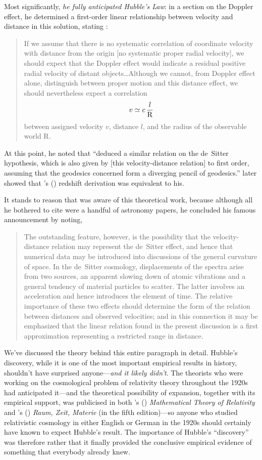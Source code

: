 \documentclass[12 pt]{article}
\def\citeapos#1{\citeauthor{#1}'s (\citeyear{#1})}
\begin{document}
Most significantly, \textit{he fully anticipated Hubble's Law}: in a section on the Doppler effect, he determined a first-order linear relationship between velocity and distance in this solution, stating \citep{Robertson1928}:
\begin{quotation}
If we assume that there is no systematic correlation of coordinate velocity with distance from the origin [no systematic proper radial velocity], we should expect that the Doppler effect would indicate a residual positive radial velocity of distant objects\ldots Although we cannot, from Doppler effect alone, distinguish between proper motion and this distance effect, we should nevertheless expect a correlation
\[v\simeq c\,{l \over \mathrm{R}}\]
between assigned velocity $v$, distance $l$, and the radius of the observable world R.
\end{quotation}
At this point, he noted that \citet{Weyl1923b} ``deduced a similar relation on the de~Sitter hypothesis, which is also given by [this velocity-distance relation] to first order, assuming that the geodesics concerned form a diverging pencil of geodesics.'' \citet{Weyl1930} later showed that \citeapos{Robertson1928} redshift derivation was equivalent to his.

It stands to reason that \citet{Hubble1929} was aware of this theoretical work, because although all he bothered to cite were a handful of astronomy papers, he concluded his famous announcement by noting,
\begin{quotation}
The outstanding feature, however, is the possibility that the velocity-distance relation may represent the de~Sitter effect, and hence that numerical data may be introduced into discussions of the general curvature of space. In the de~Sitter cosmology, displacements of the spectra arise from two sources, an apparent slowing down of atomic vibrations and a general tendency of material particles to scatter. The latter involves an acceleration and hence introduces the element of time. The relative importance of these two effects should determine the form of the relation between distances and observed velocities; and in this connection it may be emphasized that the linear relation found in the present discussion is a first approximation representing a restricted range in distance.
\end{quotation}
We've discussed the theory behind this entire paragraph in detail. Hubble's discovery, while it is one of the most important empirical results in history, shouldn't have surprised anyone---\textit{and it likely didn't}. The theorists who were working on the cosmological problem of relativity theory throughout the 1920s had anticipated it---and the theoretical possibility of expansion, together with its empirical support, was publicised in both \citeapos{Eddington1923} \textit{Mathematical Theory of Relativity} and \citeapos{Weyl1923a} \textit{Raum, Zeit, Materie} (in the fifth edition)---so anyone who studied relativistic cosmology in either English or German in the 1920s should certainly have known to expect Hubble's result. The importance of Hubble's ``discovery'' was therefore rather that it finally provided the conclusive empirical evidence of  something that everybody already knew.
\end{document}
